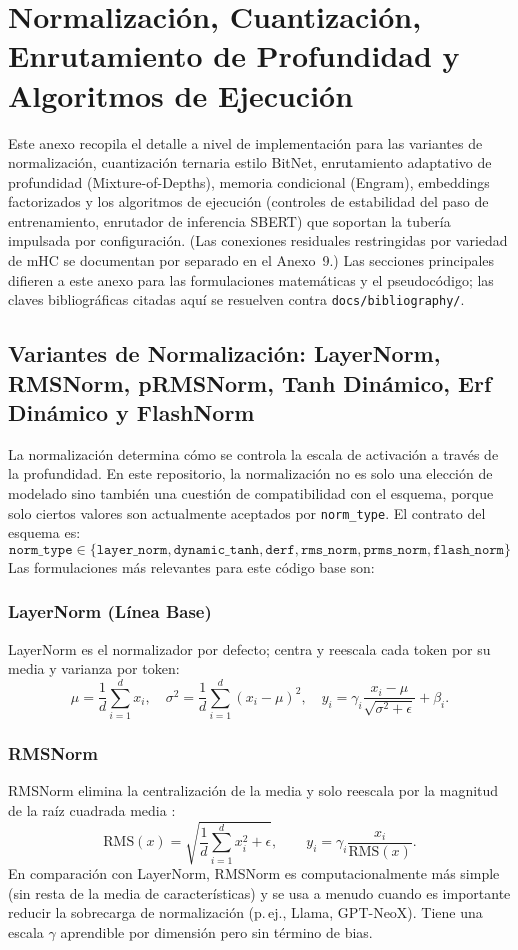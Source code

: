 \section{Normalización, Cuantización, Enrutamiento de Profundidad y Algoritmos de Ejecución}
\label{sec:annex-norm-bitnet-mod}

Este anexo recopila el detalle a nivel de implementación para las variantes de normalización, cuantización ternaria estilo BitNet, enrutamiento adaptativo de profundidad (Mixture-of-Depths), memoria condicional (Engram), embeddings factorizados y los algoritmos de ejecución (controles de estabilidad del paso de entrenamiento, enrutador de inferencia SBERT) que soportan la tubería impulsada por configuración. (Las conexiones residuales restringidas por variedad de mHC se documentan por separado en el Anexo~9.) Las secciones principales difieren a este anexo para las formulaciones matemáticas y el pseudocódigo; las claves bibliográficas citadas aquí se resuelven contra \texttt{docs/bibliography/}.

\subsection{Variantes de Normalización: LayerNorm, RMSNorm, pRMSNorm, Tanh Dinámico, Erf Dinámico y FlashNorm}

La normalización determina cómo se controla la escala de activación a través de la profundidad. En este repositorio, la normalización no es solo una elección de modelado sino también una cuestión de compatibilidad con el esquema, porque solo ciertos valores son actualmente aceptados por \texttt{norm\_type}. El contrato del esquema es:
\[
\texttt{norm\_type} \in \{\texttt{layer\_norm}, \texttt{dynamic\_tanh}, \texttt{derf}, \texttt{rms\_norm}, \texttt{prms\_norm}, \texttt{flash\_norm}\}
\]
Las formulaciones más relevantes para este código base son:

\subsubsection{LayerNorm (Línea Base)}
LayerNorm \citep{ba2016layer} es el normalizador por defecto; centra y reescala cada token por su media y varianza por token:
\[
\mu = \frac{1}{d}\sum_{i=1}^{d} x_i, \quad \sigma^2 = \frac{1}{d}\sum_{i=1}^{d}(x_i - \mu)^2, \quad y_i = \gamma_i \frac{x_i - \mu}{\sqrt{\sigma^2 + \epsilon}} + \beta_i.
\]

\subsubsection{RMSNorm}
RMSNorm elimina la centralización de la media y solo reescala por la magnitud de la raíz cuadrada media \citep{zhang_root_2019}:
\[
\mathrm{RMS}(x)=\sqrt{\frac{1}{d}\sum_{i=1}^{d}x_i^2+\epsilon},\qquad
y_i=\gamma_i\frac{x_i}{\mathrm{RMS}(x)}.
\]
En comparación con LayerNorm, RMSNorm es computacionalmente más simple (sin resta de la media de características) y se usa a menudo cuando es importante reducir la sobrecarga de normalización (p.\,ej., Llama, GPT-NeoX). Tiene una escala $\gamma$ aprendible por dimensión pero sin término de bias.

